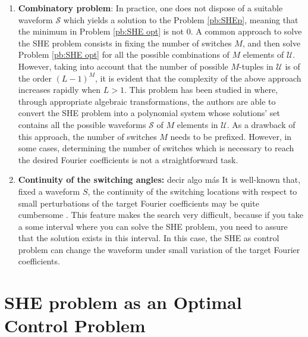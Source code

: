 \documentclass[twocolumn]{autart}    %
\begin{document}
\begin{enumerate}
    \item \textbf{Combinatory problem}: 
In practice,  one does not dispose of a suitable waveform $\mathcal{S}$ which yields a solution to the Problem \ref{pb:SHEp}, meaning that the minimum in Problem \ref{pb:SHE opt} is not 0.  
 A common approach to solve the SHE problem consists in fixing the number of switches $M$, and then solve Problem \ref{pb:SHE opt} for  all the possible combinations of $M$ elements of $\mathcal{U}$. 
However, taking into account that the number of possible $M$-tuples  in $\mathcal U$ is of the order $(L-1)^M$, it is evident that the complexity of the above approach increases rapidly when $L>1$. 
This problem has been studied in \cite{Yang2015} where, through appropriate algebraic transformations, the authors are able to convert the SHE problem into a polynomial system whose solutions' set contains all the possible waveforms $\mathcal S$ of $M$ elements in $\mathcal{U}$. 
As a drawback of this approach, the number of switches $M$ needs to be prefixed. However, in some cases,  determining the number of switches which is necessary to reach the desired Fourier coefficients is not a straightforward task.

	\item \textbf{Continuity of the switching angles:} {\color{red} decir algo más}
	It is well-known that, fixed a waveform $S$, the continuity of the switching locations with respect to small perturbations of the target Fourier coefficients may be quite cumbersome \cite{Yang2017}. This feature makes the  search very difficult, because if you take a some interval where you can solve the SHE problem, you need to assure that the solution exists in this interval. In this case, the SHE as control problem can change the waveform under small variation of the target Fourier coefficients.

\end{enumerate}
%
%

%
%

\section{SHE problem as an Optimal Control Problem}\label{sec:Contributions}
\end{document}
